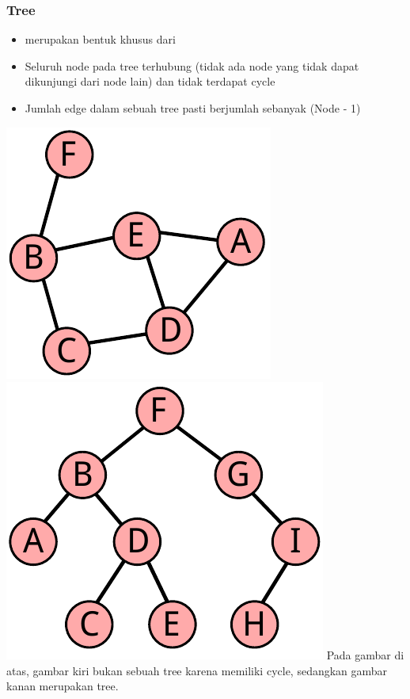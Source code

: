 \begin{frame}
\frametitle{Tree}
\begin{itemize}
  \item {} merupakan bentuk khusus dari \fgraph
  \item Seluruh node pada tree terhubung (tidak ada node yang tidak dapat dikunjungi dari node lain) dan tidak terdapat \alert{cycle}
  \item Jumlah edge dalam sebuah tree pasti berjumlah sebanyak (Node - 1)
\end{itemize}

\includegraphics[width=3.5 cm]{asset/not-tree.pdf}
\hspace{\fill}
\includegraphics[width=4 cm]{asset/tree.pdf}
\newline\newline
Pada gambar di atas, gambar kiri bukan sebuah tree karena memiliki cycle, sedangkan gambar kanan merupakan tree. 
\end{frame}

